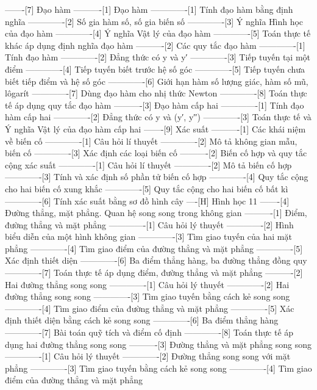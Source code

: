 -------[7] Đạo hàm
----------[1] Đạo hàm
-------------[1] Tính đạo hàm bằng định nghĩa
-------------[2] Số gia hàm số, số gia biến số
-------------[3] Ý nghĩa Hình học của đạo hàm
-------------[4] Ý nghĩa Vật lý của đạo hàm
-------------[5] Toán thực tế khác áp dụng định nghĩa đạo hàm
----------[2] Các quy tắc đạo hàm
-------------[1] Tính đạo hàm
-------------[2] Đẳng thức có y và y′
-------------[3] Tiếp tuyến tại một điểm
-------------[4] Tiếp tuyến biết trước hệ số góc
-------------[5] Tiếp tuyến chưa biết tiếp điểm và hệ số góc
-------------[6] Giới hạn hàm số lượng giác, hàm số mũ, lôgarít
-------------[7] Dùng đạo hàm cho nhị thức Newton
-------------[8] Toán thực tế áp dụng quy tắc đạo hàm
----------[3] Đạo hàm cấp hai
-------------[1] Tính đạo hàm cấp hai
-------------[2] Đẳng thức có y và (y′, y′′)
-------------[3] Toán thực tế và Ý nghĩa Vật lý của đạo hàm cấp hai
-------[9] Xác suất
----------[1] Các khái niệm về biến cố
-------------[1] Câu hỏi lí thuyết
-------------[2] Mô tả không gian mẫu, biến cố
-------------[3] Xác định các loại biến cố
----------[2] Biến cố hợp và quy tắc cộng xác suất
-------------[1] Câu hỏi lí thuyết
-------------[2] Mô tả biến cố hợp
-------------[3] Tính và xác định số phần tử biến cố hợp
-------------[4] Quy tắc cộng cho hai biến cố xung khắc
-------------[5] Quy tắc cộng cho hai biến cố bất kì
-------------[6] Tính xác suất bằng sơ đồ hình cây
----[H] Hình học 11
-------[4] Đường thẳng, mặt phẳng. Quan hệ song song trong không gian
----------[1] Điểm, đường thẳng và mặt phẳng
-------------[1] Câu hỏi lý thuyết
-------------[2] Hình biểu diễn của một hình không gian
-------------[3] Tìm giao tuyến của hai mặt phẳng
-------------[4] Tìm giao điểm của đường thẳng và mặt phẳng
-------------[5] Xác định thiết diện
-------------[6] Ba điểm thẳng hàng, ba đường thẳng đồng quy
-------------[7] Toán thực tế áp dụng điểm, đường thẳng và mặt phẳng
----------[2] Hai đường thẳng song song
-------------[1] Câu hỏi lý thuyết
-------------[2] Hai đường thẳng song song
-------------[3] Tìm giao tuyến bằng cách kẻ song song
-------------[4] Tìm giao điểm của đường thẳng và mặt phẳng
-------------[5] Xác định thiết diện bằng cách kẻ song song
-------------[6] Ba điểm thẳng hàng
-------------[7] Bài toán quỹ tích và điểm cố định
-------------[8] Toán thực tế áp dụng hai đường thẳng song song
----------[3] Đường thẳng và mặt phẳng song song
-------------[1] Câu hỏi lý thuyết
-------------[2] Đường thẳng song song với mặt phẳng
-------------[3] Tìm giao tuyến bằng cách kẻ song song
-------------[4] Tìm giao điểm của đường thẳng và mặt phẳng
